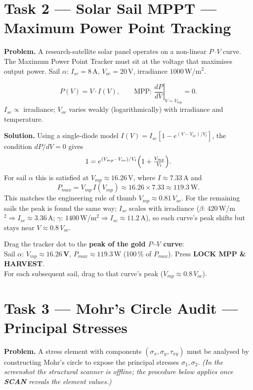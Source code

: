 \documentclass[11pt]{article}
\newcommand{\task}[2]{\section{Task #1 --- #2}}
\begin{document}
\task{2}{Solar Sail MPPT --- Maximum Power Point Tracking}
\textbf{Problem.} A research-satellite solar panel operates on a non-linear
$P$--$V$ curve. The Maximum Power Point Tracker must sit at the voltage that
maximises output power. Sail $\alpha$: $I_{sc}=8$\,A, $V_{oc}=20$\,V,
irradiance $1000$\,W/m$^2$.

\begin{relbox}
\[
P(V)=V\cdot I(V),\qquad
\text{MPP: } \left.\frac{dP}{dV}\right|_{V=V_{mp}}=0 .
\]
$I_{sc}\propto$ irradiance; $V_{oc}$ varies weakly (logarithmically) with
irradiance and temperature.
\end{relbox}

\textbf{Solution.} Using a single-diode model $I(V)=I_{sc}\!\left[1-e^{(V-V_{oc})/V_t}\right]$,
the condition $dP/dV=0$ gives
\[
1=e^{(V_{mp}-V_{oc})/V_t}\Bigl(1+\tfrac{V_{mp}}{V_t}\Bigr).
\]
For sail $\alpha$ this is satisfied at $V_{mp}\approx16.26$\,V, where
$I\approx7.33$\,A and
\[
P_{max}=V_{mp}\,I(V_{mp})\approx16.26\times7.33\approx119.3\ \text{W}.
\]
This matches the engineering rule of thumb $V_{mp}\approx0.81\,V_{oc}$.
For the remaining sails the peak is found the same way; $I_{sc}$ scales with
irradiance ($\beta$: $420$\,W/m$^2\!\Rightarrow I_{sc}\approx3.36$\,A;
$\gamma$: $1400$\,W/m$^2\!\Rightarrow I_{sc}\approx11.2$\,A), so each curve's
peak shifts but stays near $V\approx0.8\,V_{oc}$.

\begin{answer}
Drag the tracker dot to the \textbf{peak of the gold $P$--$V$ curve}:\\
Sail $\alpha$: \textbf{$V_{mp}\approx16.26$\,V}, $P_{max}\approx119.3$\,W (100\,\% of $P_{max}$). Press \textbf{LOCK MPP \& HARVEST}.\\
For each subsequent sail, drag to that curve's peak ($V_{mp}\approx0.8\,V_{oc}$).
\end{answer}

\task{3}{Mohr's Circle Audit --- Principal Stresses}
\textbf{Problem.} A stress element with components $(\sigma_x,\sigma_y,\tau_{xy})$
must be analysed by constructing Mohr's circle to expose the principal
stresses $\sigma_1,\sigma_2$. \emph{(In the screenshot the structural scanner
is offline; the procedure below applies once \textbf{SCAN} reveals the element
values.)}
\end{document}
